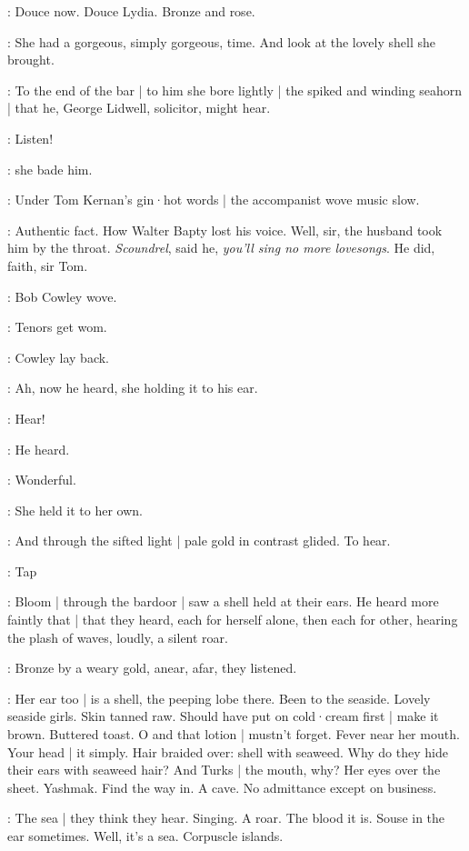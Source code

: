 :
Douce now.
Douce Lydia.
Bronze and rose.

:
She had a gorgeous,
simply gorgeous,
time.
And look at the lovely shell she brought.

:
To the end of the bar |
to him she bore lightly |
the spiked and winding seahorn |
that he,
George Lidwell,
solicitor,
might hear.

\MissD:
Listen!

:
she bade him.

:
Under Tom Kernan's gin·hot words |
the accompanist wove music slow.

:
Authentic fact.
How Walter Bapty lost his voice.
Well, sir,
the husband took him by the throat.
\emph{Scoundrel},
said he,
\emph{you'll sing no more lovesongs}.
He did,
faith,
sir Tom.

:
Bob Cowley wove.

\BloomIntB:
Tenors get wom.

:
Cowley lay back.

:
Ah,
now he heard,
she holding it to his ear.

\MissD:
Hear!

:
He heard.

\lidwell:
Wonderful.

:
She held it to her own.

:
And through the sifted light |
pale gold in contrast glided.
To hear.

\stripling:
Tap

:
Bloom |
through the bardoor |
saw a shell held at their ears.
He heard more faintly that |
that they heard,
each for herself alone,
then each for other,
hearing the plash of waves,
loudly,
a silent roar.

:
Bronze by a weary gold,
anear,
afar,
they listened.

\BloomIntA:
Her ear too |
is a shell,
the peeping lobe there.
Been to the seaside.
Lovely seaside girls.
Skin tanned raw.
Should have put on cold·cream first |
make it brown.
Buttered toast.
O and that lotion |
mustn't forget.
Fever near her mouth.
Your head |
it simply.
Hair braided over:
shell with seaweed.
Why do they hide their ears with seaweed hair?
And Turks |
the mouth,
why?
Her eyes over the sheet.
Yashmak.
Find the way in.
A cave.
No admittance except on business.

\BloomIntA:
The sea |
they think they hear.
Singing.
A roar.
The blood it is.
Souse
in the ear sometimes.
Well,
it's a sea.
Corpuscle islands.

